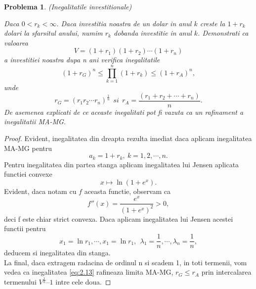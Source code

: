 \documentclass[a4paper,12pt,oneside]{report}
\newtheorem{problem}{Problema}
\begin{document}
\begin{problem} (Inegalitatile investitionale)

Daca \(0< r_{k} < \infty\). Daca investitia noastra de un dolar in anul \(k\) creste la \(1 +  r_{k}\) dolari la sfarsitul anului, numim \(r_{k}\) dobanda investitie in anul \(k\). Demonstrati ca valoarea
\begin{displaymath}
  V = \left ( 1 + r_{1} \right )\left ( 1 + r_{2} \right )\cdots \left ( 1 + r_{n} \right )
\end{displaymath}
a investitiei noastra dupa n ani verifica inegalitatile
\begin{displaymath}
  \left ( 1 + r_{G} \right )^{n} \leq \prod_{k = 1}^{n} \left ( 1 + r_{k} \right )\leq \left ( 1 + r_{A} \right )^{n}, \label{eq:2.13} \tag{2.13}
\end{displaymath}
unde
\begin{displaymath}
  r_{G} = \left ( r_{1}r_{2} \cdots r_{n}\right )^{\frac{1}{n}}~~ si~~ r_{A} = \frac{\left ( r_{1} + r_{2} +  \cdots+ r_{n}\right )}{n}.
\end{displaymath}
De asemenea explicati de ce aceaste inegalitati  pot fi vazuta ca un rafinament a inegalitatii MA-MG.
\end{problem}
\begin{proof}
Evident, inegalitatea din dreapta rezulta imediat daca aplicam inegalitatea MA-MG pentru
\begin{displaymath}
  a_{k} = 1 + r_{k},~ k =1,2,\cdots, n.
\end{displaymath}
Pentru inegalitatea din partea stanga aplicam inegalitatea lui Jensen aplicata functiei convexe
\[x \mapsto \ln\left ( 1 + e^{x} \right ).\]
Evident, daca notam cu $f$ aceasta functie, observam ca
\[
f''(x)=\frac{e^x}{(1+e^x)^2}>0,
\]
deci f este chiar strict convexa. Daca aplicam inegalitatea lui Jensen acestei functii pentru
\[
x_1=\ln r_1,\cdots, x_1=\ln r_1,~~\lambda_1=\frac{1}{n},\cdots, \lambda_n=\frac{1}{n},
\]
deducem si inegalitatea din stanga.\\
La final, daca extragem radacina de ordinul n si scadem 1, in toti termenii, vom vedea ca inegalitatea \ref{eq:2.13} rafineaza limita MA-MG,  \(r_{G} \leq r_{A}\) prin intercalarea termenului \(V^{\frac{1}{n}} – 1\) intre cele doua.
\end{proof}
\end{document}
